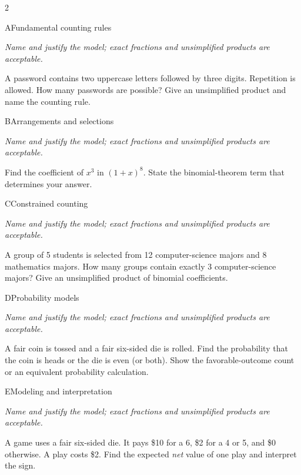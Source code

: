 \documentclass[9pt]{extarticle}
\begin{document}
\CoreWorkArea
\FormBreak
{}
\begin{multicols}{2}
\begin{CoreProblem}{A}{Fundamental counting rules}
{\scriptsize\textit{Name and justify the model; exact fractions and unsimplified products are acceptable.}\par}
A password contains two uppercase letters followed by three digits.
    Repetition is allowed. How many passwords are possible? Give an unsimplified
    product and name the counting rule.
\end{CoreProblem}
\begin{CoreProblem}{B}{Arrangements and selections}
{\scriptsize\textit{Name and justify the model; exact fractions and unsimplified products are acceptable.}\par}
Find the coefficient of $x^3$ in $(1+x)^8$. State the binomial-theorem
    term that determines your answer.
\end{CoreProblem}
\begin{CoreProblem}{C}{Constrained counting}
{\scriptsize\textit{Name and justify the model; exact fractions and unsimplified products are acceptable.}\par}
A group of 5 students is selected from 12 computer-science majors and
    8 mathematics majors. How many groups contain exactly 3 computer-science
    majors? Give an unsimplified product of binomial coefficients.
\end{CoreProblem}
\columnbreak
\begin{CoreProblem}{D}{Probability models}
{\scriptsize\textit{Name and justify the model; exact fractions and unsimplified products are acceptable.}\par}
A fair coin is tossed and a fair six-sided die is rolled. Find the
    probability that the coin is heads or the die is even (or both). Show the
    favorable-outcome count or an equivalent probability calculation.
\end{CoreProblem}
\begin{CoreProblem}{E}{Modeling and interpretation}
{\scriptsize\textit{Name and justify the model; exact fractions and unsimplified products are acceptable.}\par}
A game uses a fair six-sided die. It pays \$10 for a 6, \$2 for a 4
    or 5, and \$0 otherwise. A play costs \$2. Find the expected \emph{net}
    value of one play and interpret the sign.
\end{CoreProblem}
\end{multicols}
\end{document}
